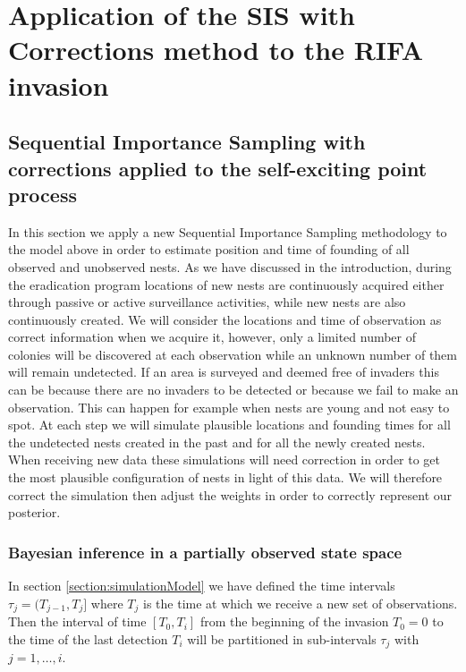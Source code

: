 \chapter[Application of the SIS with Corrections method to the RIFA invasion]{Application of the SIS with Corrections method to the RIFA invasion}
\label{ch:ModelMethod}



{\color{red}
\section{Sequential Importance Sampling with corrections applied to the self-exciting point process} \label{sec:SISMethod}

In this section we apply a new Sequential Importance Sampling methodology to the model above in order to estimate position and time of founding of all observed and unobserved nests. As we have discussed in the introduction, during the eradication program locations of new nests are continuously acquired either through passive or active surveillance activities, while new nests are also continuously created. We will consider the locations and time of observation as correct information when we acquire it, however, only a limited number of colonies will be discovered at each observation while an unknown number of them will remain undetected. If an area is surveyed and deemed free of invaders this can be because there are no invaders to be detected or because we fail to make an observation. This can happen for example when nests are young and not easy to spot. At each step we will simulate plausible locations and founding times for all the undetected nests created in the past and for all the newly created nests. When receiving new data these simulations will need correction in order to get the most plausible configuration of nests in light of this data. We will therefore correct the simulation then adjust the weights in order to correctly represent our posterior.

\subsection{Bayesian inference in a partially observed state space} \label{subsec:POS}

In section \ref{section:simulationModel} we have defined the time intervals $\tau_j = (T_{j-1}, T_j]$ where $T_j$ is the time at which we receive a new set of observations. Then the interval of time $[T_0, T_i]$ from the beginning of the invasion $T_0=0$ to the time of the last detection $T_i$ will be partitioned in sub-intervals $\tau_j$ with $j = 1, \dots, i$.

}
